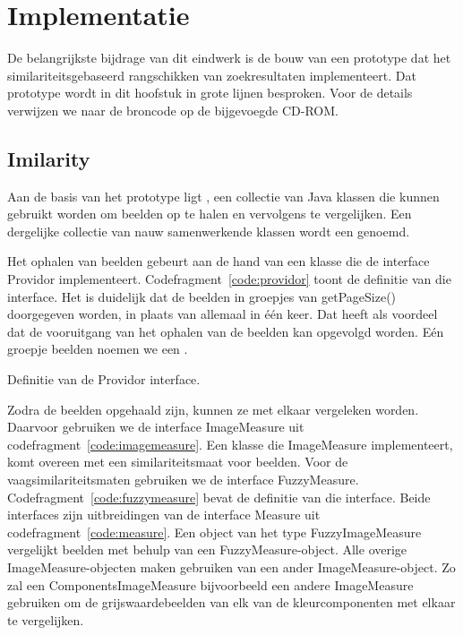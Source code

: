 \chapter{Implementatie}

De belangrijkste bijdrage van dit eindwerk is de bouw van een prototype
dat het similariteitsgebaseerd rangschikken van zoekresultaten implementeert.
Dat prototype wordt in dit hoofstuk in grote lijnen besproken. Voor de details
verwijzen we naar de broncode op de bijgevoegde CD-ROM.

\section{Imilarity}

Aan de basis van het prototype ligt , een collectie van Java klassen 
die kunnen gebruikt worden om beelden op te halen en vervolgens te vergelijken. Een 
dergelijke collectie van nauw samenwerkende klassen wordt een  genoemd. 

Het ophalen van beelden gebeurt aan de hand van een klasse die de interface 
{\klassefont Providor} implementeert. Codefragment~\ref{code:providor} toont de definitie
van die interface. Het is duidelijk dat de beelden in groepjes van 
{\klassefont getPageSize()} doorgegeven worden, in plaats van allemaal in \'e\'en keer. 
Dat heeft als voordeel dat de vooruitgang van het ophalen van de beelden kan 
opgevolgd worden. E\'en groepje beelden noemen we een .

\begin{code}[bp]
\vspace{5pt}
\begin{lgrind}

\end{lgrind}
\vspace{5pt}
\caption{\label{code:providor}Definitie van de {\klassefont Providor} interface.}
\end{code}

Zodra de beelden opgehaald zijn, kunnen ze met elkaar vergeleken worden. Daarvoor
gebruiken we de interface {\klassefont ImageMeasure} uit 
codefragment~\ref{code:imagemeasure}. Een klasse die {\klassefont ImageMeasure} 
implementeert, komt overeen met een similariteitsmaat voor beelden. Voor de 
vaagsimilariteitsmaten gebruiken we de interface {\klassefont FuzzyMeasure}.
Codefragment~\ref{code:fuzzymeasure} bevat de definitie van die interface.
Beide interfaces zijn uitbreidingen van de interface {\klassefont Measure}
uit codefragment~\ref{code:measure}. 
Een object van het type {\klassefont FuzzyImageMeasure} vergelijkt beelden
met behulp van een {\klassefont FuzzyMeasure}-object. Alle overige
{\klassefont ImageMeasure}-objecten maken gebruiken van een ander 
{\klassefont ImageMeasure}-object. Zo zal een {\klassefont ComponentsImageMeasure}
bijvoorbeeld een andere {\klassefont ImageMeasure} gebruiken om de grijswaardebeelden
van elk van de kleurcomponenten met elkaar te vergelijken. 

